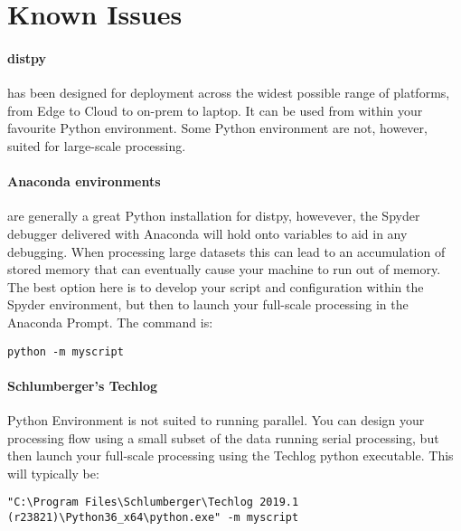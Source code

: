 \section{Known Issues}
\paragraph{distpy}
has been designed for deployment across the widest possible range of platforms, from Edge to Cloud to on-prem to laptop. 
It can be used from within your favourite Python environment. Some Python environment are not, however, suited for large-scale processing. 
 
\paragraph{Anaconda environments} are generally a great Python installation for distpy, howevever, the Spyder debugger delivered with 
Anaconda will hold onto variables to aid in any debugging. 
When processing large datasets this can lead to an accumulation of stored memory that 
can eventually cause your machine to run out of memory. 
The best option here is to develop your script and configuration within the Spyder environment, 
but then to launch your full-scale processing in the Anaconda Prompt.
The command is:
\begin{lstlisting}
python -m myscript
\end{lstlisting}
 
\paragraph{Schlumberger's Techlog}
Python Environment is not suited to running parallel. 
You can design your processing flow using a small subset of the data running serial processing, 
but then launch your full-scale processing using the Techlog python executable. This will typically be:
\begin{lstlisting}
"C:\Program Files\Schlumberger\Techlog 2019.1 (r23821)\Python36_x64\python.exe" -m myscript
\end{lstlisting}


